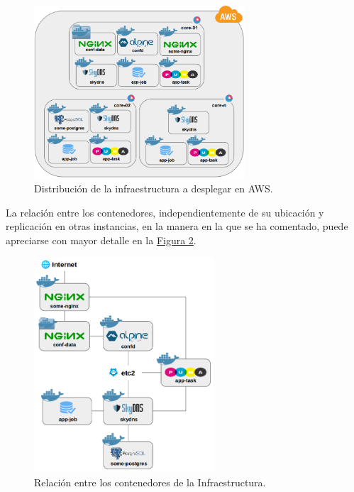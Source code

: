 \begin{figure}[H]
\centering
\includegraphics[width=0.7\textwidth]{images/figures/aws-1-iteration.png}
\caption{Distribución de la infraestructura a desplegar en AWS. \label{fig:aws-1-iteration}}
\label{fig:aws-1-iteration}
\end{figure}

La relación entre los contenedores, independientemente de su ubicación y replicación en otras instancias, en la manera en la que se ha comentado, puede apreciarse con mayor detalle en la \hyperref[fig:aws-2-iteration]{Figura \ref{fig:aws-2-iteration}}.

\begin{figure}[H]
\centering
\includegraphics[width=0.6\textwidth]{images/figures/aws-2-iteration.png}
\caption{Relación entre los contenedores de la Infraestructura. \label{fig:aws-2-iteration}}
\end{figure}

